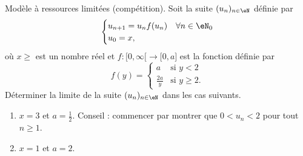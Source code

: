 
\begin{exercice}\label{exoTD3-0007}

	Modèle à ressources limitées (compétition). Soit la suite $(u_n)_{n\in\eN}$ définie par
	\begin{equation}
		\begin{cases}
			u_{n+1}=u_nf(u_n)	&	\text{}\forall n\in \eN_0\\
			u_0=x,
		\end{cases}
	\end{equation}
	où $x\geq$ est un nombre réel et $f\colon \mathopen[ 0 , \infty [\to \mathopen[ 0 , a \mathclose]$ est la fonction définie par
	\begin{equation}
		f(y)=\begin{cases}
			a	&	\text{si }y<2\\
			\frac{ 2a }{ y }	&	 \text{si }y\geq 2.
		\end{cases}
	\end{equation}
	Déterminer la limite de la suite $(u_n)_{n\in\eN}$ dans les cas suivants.
	\begin{enumerate}
		\item
			$x=3$ et $a=\frac{1}{ 2 }$. Conseil : commencer par montrer que $0<u_n<2$ pour tout $n\geq 1$.
		\item
			$x=1$ et $a=2$.
	\end{enumerate}

\end{exercice}

